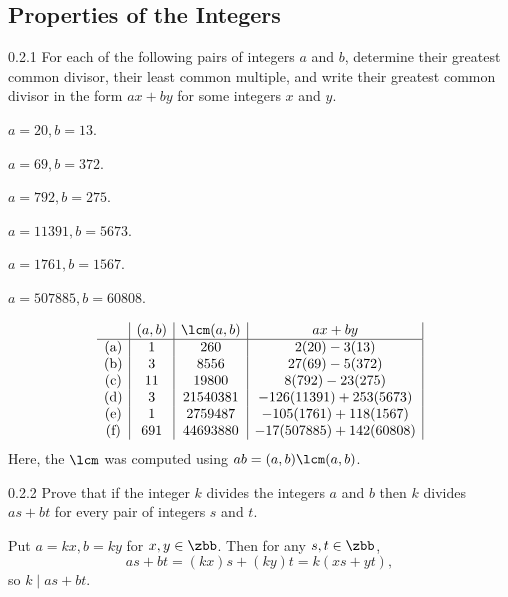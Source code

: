 \subsection{Properties of the Integers}

\begin{exercise}{0.2.1}
    For each of the following pairs of integers $a$ and $b$, determine their greatest common divisor, their least common multiple, and write their greatest common divisor in the form $ax + by$ for some integers $x$ and $y$.
    \begin{subexercises}
        \item $a = 20, b = 13$.
        \item $a= 69, b = 372$.
        \item $a = 792, b = 275$.
        \item $a = 11391, b = 5673$.
        \item $a= 1761, b = 1567$.
        \item $a = 507885, b = 60808$.
    \end{subexercises}
\end{exercise}

\begin{sol}
    \[
        \begin{array}{*{4}{c|}}
            & (a, b) & \lcm(a, b) & ax + by \\
            \hline
            (\text a) & 1 & 260 & 2(20) - 3(13) \\
            (\text b) & 3 & 8556 & 27(69) - 5(372) \\
            (\text c) & 11 & 19800 & 8(792) - 23(275) \\
            (\text d) & 3 & 21540381 & -126(11391) + 253(5673) \\
            (\text e) & 1 & 2759487 & -105(1761) + 118(1567) \\
            (\text f) & 691 & 44693880 & -17(507885) + 142(60808)
        \end{array}
    \]
    Here, the $\lcm$ was computed using $ab = (a, b)\lcm(a, b)$.
\end{sol}

\begin{exercise}{0.2.2}
    Prove that if the integer $k$ divides the integers $a$ and $b$ then $k$ divides $as + bt$ for every pair of integers $s$ and $t$. 
\end{exercise}

\begin{sol}
    Put $a = kx, b = ky$ for $x, y \in \zbb$.
    Then for any $s, t \in \zbb$,
    \[
        as + bt = (kx)s + (ky)t = k(xs + yt),
    \]
    so $k \mid as + bt$.
\end{sol}


